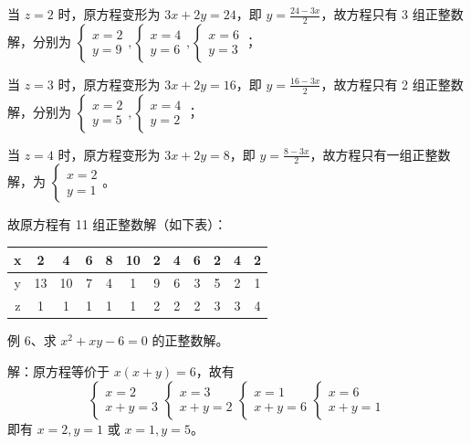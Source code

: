 \begin{questions}
\begin{solution}
当 $z = 2$ 时，原方程变形为 $3x + 2y = 24$，即 $y = \frac{24 - 3x}{2}$，故方程只有 3 组正整数解，分别为 $\begin{cases} x = 2 \\ y = 9 \end{cases}, \begin{cases} x = 4 \\ y = 6 \end{cases}, \begin{cases} x = 6 \\ y = 3 \end{cases}$；

当 $z = 3$ 时，原方程变形为 $3x + 2y = 16$，即 $y = \frac{16 - 3x}{2}$，故方程只有 2 组正整数解，分别为 $\begin{cases} x = 2 \\ y = 5 \end{cases}, \begin{cases} x = 4 \\ y = 2 \end{cases}$；

当 $z = 4$ 时，原方程变形为 $3x + 2y = 8$，即 $y = \frac{8 - 3x}{2}$，故方程只有一组正整数解，为 $\begin{cases} x = 2 \\ y = 1 \end{cases}$。

故原方程有 11 组正整数解（如下表）：

\begin{tabular}{|c|c|c|c|c|c|c|c|c|c|c|c|}
\hline
x & 2 & 4 & 6 & 8 & 10 & 2 & 4 & 6 & 2 & 4 & 2 \\ \hline
y & 13 & 10 & 7 & 4 & 1 & 9 & 6 & 3 & 5 & 2 & 1 \\ \hline
z & 1 & 1 & 1 & 1 & 1 & 2 & 2 & 2 & 3 & 3 & 4 \\ \hline
\end{tabular}
\end{solution}

\question 例 6、求 $x^2 + xy - 6 = 0$ 的正整数解。

\begin{solution}
解：原方程等价于 $x(x + y) = 6$，故有
\[ \begin{cases} x = 2 \\ x + y = 3 \end{cases} \begin{cases} x = 3 \\ x + y = 2 \end{cases} \begin{cases} x = 1 \\ x + y = 6 \end{cases} \begin{cases} x = 6 \\ x + y = 1 \end{cases} \]
即有 $x = 2, y = 1$ 或 $x = 1, y = 5$。
\end{solution}


\end{questions}
